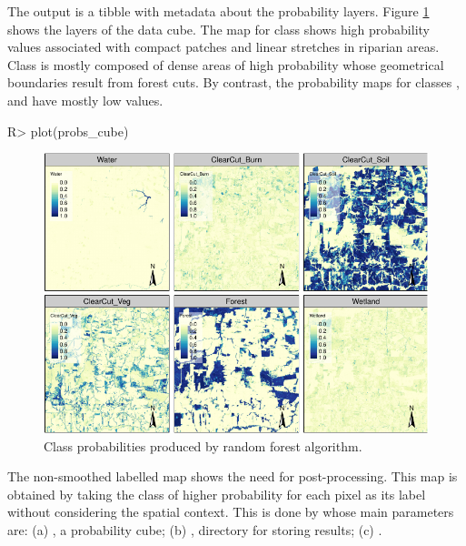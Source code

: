 \documentclass[
  shortnames]{jss}
\begin{document}
The output is a tibble with metadata about the probability layers. Figure \ref{fig:pcube} shows the layers of the data cube. The map for class  shows high probability values associated with compact patches and linear stretches in riparian areas. Class  is mostly composed of dense areas of high probability whose geometrical boundaries result from forest cuts. By contrast, the probability maps for classes ,  and  have mostly low values.

\begin{CodeChunk}
\begin{CodeInput}
R> plot(probs_cube)
\end{CodeInput}
\begin{figure}[h]

{\centering \includegraphics{Bayesian_smoothing_JSS_files/figure-latex/pcube-1} 

}

\caption[Class probabilities produced by random forest algorithm]{Class probabilities produced by random forest algorithm.}\label{fig:pcube}
\end{figure}
\end{CodeChunk}

The non-smoothed labelled map shows the need for post-processing. This map is obtained by taking the class of higher probability for each pixel as its label without considering the spatial context. This is done by  whose main parameters are: (a) , a probability cube; (b) , directory for storing results; (c) .
\end{document}
